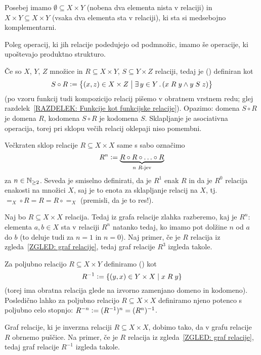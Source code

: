 		Posebej imamo  $\emptyset \subseteq X \times Y$ (nobena dva elementa nista v relaciji) in  $X \times Y\subseteq X \times Y$ (vsaka dva elementa sta v relaciji), ki sta si medsebojno komplementarni.
		
		Poleg operacij, ki jih relacije podedujejo od podmnožic, imamo še operacije, ki upoštevajo produktno strukturo.
		
		Če so $X$, $Y$, $Z$ množice in $R \subseteq X \times Y$, $S \subseteq Y \times Z$ relaciji, tedaj je  ()  definiran kot
		\[S \circ R \dfeq \set[1]{(x, z) \in X \times Z}{\some{y}[Y]{x \mathrel{R} y \land y \mathrel{S} z}}\]
		(po vzoru funkcij tudi kompozicijo relacij pišemo v obratnem vrstnem redu; glej razdelek~\ref{RAZDELEK: Funkcije kot funkcijske relacije}). Opazimo: domena $S \circ R$ je domena $R$, kodomena $S \circ R$ je kodomena $S$. Sklapljanje je asociativna operacija, torej pri sklopu večih relacij oklepaji niso pomembni.
		
		Večkraten sklop relacije $R \subseteq X \times X$ same s sabo označimo
		\[R^n \mathrel{\mathop:}= \underbrace{R \circ R \circ \ldots \circ R}_{\text{$n$ $R$-jev}}\]
		za $n \in \mathbb{N}_{\geq 2}$. Seveda je smiselno definirati, da je $R^1$ enak $R$ in da je $R^0$ relacija enakosti na množici $X$, saj je to enota za sklapljanje relacij na $X$, tj.~$=_X \circ R = R = R \circ =_X$ (premisli, da je to res!).
		
		\begin{zgled}
			Naj bo $R \subseteq X \times X$ relacija. Tedaj iz grafa relacije zlahka razberemo, kaj je $R^n$: elementa $a, b \in X$ sta v relaciji $R^n$ natanko tedaj, ko imamo pot dolžine $n$ od $a$ do $b$ (to deluje tudi za $n = 1$ in $n = 0$). Naj primer, če je $R$ relacija iz zgleda~\ref{ZGLED: graf relacije}, tedaj graf relacije $R^3$ izgleda takole.
			
		\end{zgled}
		
		Za poljubno relacijo $R \subseteq X \times Y$ definiramo  () \df{relacijo} kot
		\[R^{-1} \dfeq \set{(y, x) \in Y \times X}{x \mathrel{R} y}\]
		(torej ima obratna relacija glede na izvorno zamenjano domeno in kodomeno). Posledično lahko za poljubno relacijo $R \subseteq X \times X$ definiramo njeno potenco s poljubno celo stopnjo: $R^{-n} \mathrel{\mathop:}= (R^{-1})^n = (R^n)^{-1}$.
		
		\begin{zgled}
			Graf relacije, ki je inverzna relaciji $R \subseteq X \times X$, dobimo tako, da v grafu relacije $R$ obrnemo puščice. Na primer, če je $R$ relacija iz zgleda~\ref{ZGLED: graf relacije}, tedaj graf relacije $R^{-1}$ izgleda takole.
			
			\note{graf $R^{-1}$}
		\end{zgled}
		
